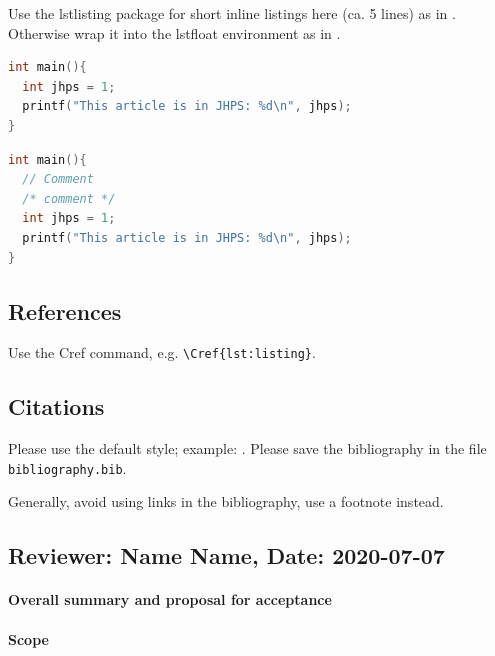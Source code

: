 \documentclass{jhps}
\begin{document}
Use the lstlisting package for short inline listings here (ca. 5 lines) as in .
Otherwise wrap it into the lstfloat environment as in .

\begin{lstlisting}[caption="My listing",label=lst:listing,language=C]
int main(){
  int jhps = 1;
  printf("This article is in JHPS: %d\n", jhps);
}
\end{lstlisting}

\begin{lstfloat}
  \begin{lstlisting}[caption="My longer listing",label=lst:longlisting,language=C]
int main(){
  // Comment
  /* comment */
  int jhps = 1;
  printf("This article is in JHPS: %d\n", jhps);
}
  \end{lstlisting}
\end{lstfloat}


\subsection{References}

Use the Cref command, e.g. \verb|\Cref{lst:listing}|.

\subsection{Citations}

Please use the default style; example: \cite{misc1998}.
Please save the bibliography in the file \texttt{bibliography.bib}.

Generally, avoid using links in the bibliography, use a footnote instead.




\reviews

\subsection*{Reviewer: Name Name, Date: 2020-07-07}

\paragraph{Overall summary and proposal for acceptance}

\paragraph{Scope} %
\end{document}
